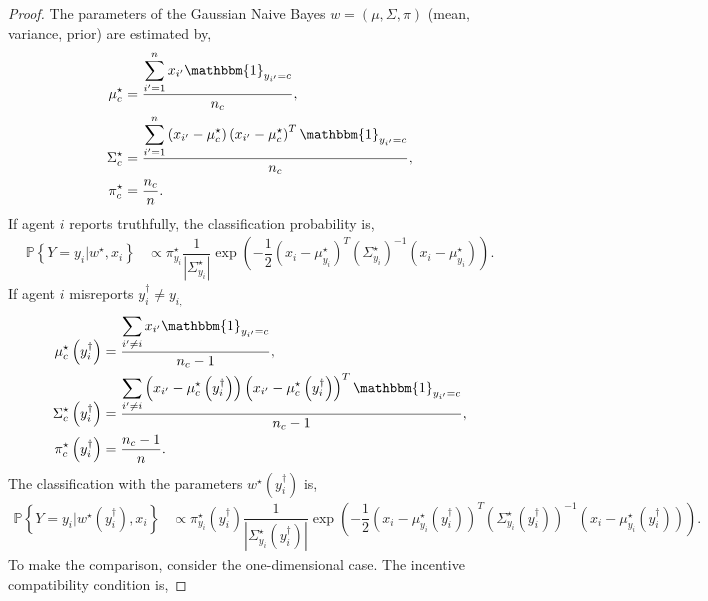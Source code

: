 \documentclass{article}
\begin{document}
\begin{proof} \label{proof:gnbpf} 
The parameters of the Gaussian Naive Bayes $w  = \left(\mu, \Sigma, \pi\right)$ (mean, variance, prior) are estimated by,
\begin{align*}
\mu^\star _{c} &= \dfrac{\displaystyle\sum_{i'=1}^{n} x_{i'} \mathbbm{1}_{y_{i'} = c}}{n_{c}},
\\ \Sigma^\star _{c} &= \dfrac{\displaystyle\sum_{i'=1}^{n} \left(x_{i'} - \mu^\star _{c}\right) \left(x_{i'} - \mu^\star _{c}\right)^{T} \mathbbm{1}_{y_{i'} = c}}{n_{c}},
\\ \pi^\star _{c} &= \dfrac{n_{c}}{n} .
\end{align*}
If agent $i $ reports truthfully, the classification probability is,
\begin{align*}
\mathbb{P} \left\{Y = y_{i} | w^\star , x_{i}\right\} &\propto \pi^\star _{y_{i}} \dfrac{1}{\left| \Sigma^\star _{y_{i}} \right|} \exp\left(- \dfrac{1}{2} \left(x_{i} - \mu^\star _{y_{i}}\right)^{T} \left(\Sigma^\star _{y_{i}}\right)^{-1} \left(x_{i} - \mu^\star _{y_{i}}\right)\right).
\end{align*}
If agent $i $ misreports $y^{\dagger}_{i} \neq  y_{i,}$
\begin{align*}
\mu^\star _{c}\left(y^{\dagger}_{i}\right) &= \dfrac{\displaystyle\sum_{i' \neq  i} x_{i'} \mathbbm{1}_{y_{i'} = c}}{n_{c} - 1},
\\ \Sigma^\star _{c}\left(y^{\dagger}_{i}\right) &= \dfrac{\displaystyle\sum_{i' \neq  i} \left(x_{i'} - \mu^\star _{c}\left(y^{\dagger}_{i}\right)\right) \left(x_{i'} - \mu^\star _{c}\left(y^{\dagger}_{i}\right)\right)^{T} \mathbbm{1}_{y_{i'} = c}}{n_{c} - 1},
\\ \pi^\star _{c}\left(y^{\dagger}_{i}\right) &= \dfrac{n_{c} - 1}{n} .
\end{align*}
The classification with the parameters $w^\star \left(y^{\dagger}_{i}\right)$ is,
\begin{align*}
\mathbb{P} \left\{Y = y_{i} | w^\star \left(y^{\dagger}_{i}\right), x_{i}\right\} &\propto \pi^\star _{y_{i}}\left(y^{\dagger}_{i}\right) \dfrac{1}{\left| \Sigma^\star _{y_{i}}\left(y^{\dagger}_{i}\right) \right|} \exp\left(- \dfrac{1}{2} \left(x_{i} - \mu^\star _{y_{i}}\left(y^{\dagger}_{i}\right)\right)^{T} \left(\Sigma^\star _{y_{i}}\left(y^{\dagger}_{i}\right)\right)^{-1} \left(x_{i} - \mu^\star _{y_{i}}\left(y^{\dagger}_{i}\right)\right)\right).
\end{align*}
To make the comparison, consider the one-dimensional case. The incentive compatibility condition is,

\end{proof}
\end{document}
